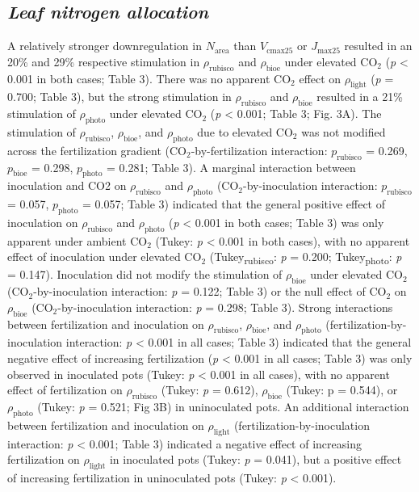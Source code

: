 \subsection{\textit{Leaf nitrogen allocation}}
A relatively stronger downregulation in $N_\mathrm{area}$ than $V_\mathrm{cmax25}$ or $J_\mathrm{max25}$ resulted in an 20\% and 29\% respective stimulation in $\rho_\mathrm{rubisco}$ and $\rho_\mathrm{bioe}$ under elevated CO$_2$ (\textit{p} < 0.001 in both cases; Table 3). There was no apparent CO$_2$ effect on $\rho_\mathrm{light}$ (\textit{p} = 0.700; Table 3), but the strong stimulation in $\rho_\mathrm{rubisco}$ and $\rho_\mathrm{bioe}$ resulted in a 21\% stimulation of $\rho_\mathrm{photo}$ under elevated CO$_2$ (\textit{p} < 0.001; Table 3; Fig. 3A). The stimulation of $\rho_\mathrm{rubisco}$, $\rho_\mathrm{bioe}$, and $\rho_\mathrm{photo}$ due to elevated CO$_2$ was not modified across the fertilization gradient (CO$_2$-by-fertilization interaction: $p_\mathrm{rubisco}$ = 0.269, $p_\mathrm{bioe}$ = 0.298, $p_\mathrm{photo}$ = 0.281; Table 3). A marginal interaction between inoculation and CO2 on $\rho_\mathrm{rubisco}$ and $\rho_\mathrm{photo}$ (CO$_2$-by-inoculation interaction: $p_\mathrm{rubisco}$ = 0.057, $p_\mathrm{photo}$ = 0.057; Table 3) indicated that the general positive effect of inoculation on $\rho_\mathrm{rubisco}$ and $\rho_\mathrm{photo}$ (\textit{p} < 0.001 in both cases; Table 3) was only apparent under ambient CO$_2$ (Tukey: \textit{p} < 0.001 in both cases), with no apparent effect of inoculation under elevated CO$_2$ (Tukey\textsubscript{rubisco}: \textit{p} = 0.200; Tukey\textsubscript{photo}: \textit{p} = 0.147). Inoculation did not modify the stimulation of $\rho_\mathrm{bioe}$ under elevated CO$_2$ (CO$_2$-by-inoculation interaction: \textit{p} = 0.122; Table 3) or the null effect of CO$_2$ on $\rho_\mathrm{bioe}$ (CO$_2$-by-inoculation interaction: \textit{p} = 0.298; Table 3). Strong interactions between fertilization and inoculation on $\rho_\mathrm{rubisco}$, $\rho_\mathrm{bioe}$, and $\rho_\mathrm{photo}$ (fertilization-by-inoculation interaction: \textit{p} < 0.001 in all cases; Table 3) indicated that the general negative effect of increasing fertilization (\textit{p} < 0.001 in all cases; Table 3) was only observed in inoculated pots (Tukey: \textit{p} < 0.001 in all cases), with no apparent effect of fertilization on $\rho_\mathrm{rubisco}$ (Tukey: \textit{p} = 0.612), $\rho_\mathrm{bioe}$ (Tukey: p = 0.544), or $\rho_\mathrm{photo}$ (Tukey: \textit{p} = 0.521; Fig 3B) in uninoculated pots. An additional interaction between fertilization and inoculation on $\rho_\mathrm{light}$ (fertilization-by-inoculation interaction: \textit{p} < 0.001; Table 3) indicated a negative effect of increasing fertilization on $\rho_\mathrm{light}$ in inoculated pots (Tukey: \textit{p} = 0.041), but a positive effect of increasing fertilization in uninoculated pots (Tukey: \textit{p} < 0.001).

